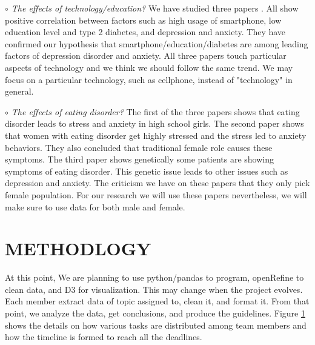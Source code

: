 \documentclass[letterpaper, 10 pt, conference]{ieeeconf}  %
\begin{document}
\par\noindent\textit{$\circ$ The effects of technology/education?}\newline
We have studied three papers \cite{demirci2015relationship}\cite{bjelland2008does}\cite{mezuk2008influence}. All show positive correlation between 
factors such as high usage of smartphone, low education level and type 2 
diabetes, and depression and anxiety. They have confirmed our hypothesis 
that smartphone/education/diabetes are among leading factors of depression 
disorder and anxiety. All three papers touch particular aspects of technology and we think we should follow the same trend.
We may focus on a particular technology, such as cellphone, instead of "technology" in general. 

\par\noindent\textit{$\circ$ The effects of eating disorder?}\newline
The 
first of the three papers \cite{sassaroli2005role} shows that eating disorder leads to stress and anxiety in 
high school girls. The second paper \cite{martz1995relationship} shows that women with eating disorder 
get highly stressed and the stress led to anxiety behaviors. They also concluded that 
traditional female role causes these symptoms. The third paper \cite{striegel2007risk} shows genetically 
some patients are showing symptoms of eating disorder. This genetic issue leads 
to other issues such as depression and anxiety. The criticism we have on these papers that they only pick 
female population. For our research we will use 
these papers nevertheless, we will make sure to use data for both male and female.  

\section{METHODLOGY}
At this point, We are planning to use python/pandas to program, openRefine to clean data, and D3 for visualization.
This may change when the project evolves. 
Each member extract data of topic assigned to, clean it, and format it. From that point, we analyze the data, get conclusions, and produce the guidelines.  
Figure \ref{fig:schedule} shows the details on how various tasks are distributed among team members 
and how the timeline is formed to reach all the deadlines. 

%
\captionsetup[figure]{labelformat=empty}
\clearpage 
\begin{figure}[hbt!]
        \centering
        
        \addvspace{250pt}
        
        \hspace{-10cm}
        
        \caption{}
        \label{fig:schedule}
\end{figure}

\clearpage 




\end{document}

